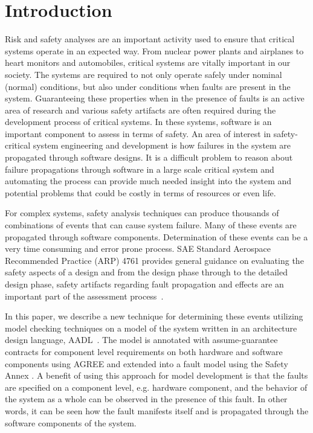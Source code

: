 \section{Introduction}
\label{sec:intro}

Risk and safety analyses are an important activity used to ensure that critical systems operate in an expected way. From nuclear power plants and airplanes to heart monitors and automobiles, critical systems are vitally important in our society. The systems are required to not only operate safely under nominal (normal) conditions, but also under conditions when faults are present in the system. Guaranteeing these properties when in the presence of faults is an active area of research and various safety artifacts are often required during the development process of critical systems. In these systems, software is an important component to assess in terms of safety. An area of interest in safety-critical system engineering and development is how failures in the system are propagated through software designs. It is a difficult problem to reason about failure propagations through software in a large scale critical system and automating the process can provide much needed insight into the system and potential problems that could be costly in terms of resources or even life. 

 For complex systems, safety analysis techniques can produce thousands of combinations of events that can cause system failure. Many of these events are propagated through software components. Determination of these events can be a very time consuming and error prone process. SAE Standard Aerospace Recommended Practice (ARP) 4761 provides general guidance on evaluating the safety aspects of a design and from the design phase through to the detailed design phase, safety artifacts regarding fault propagation and effects are an important part of the assessment process~\cite{SAE:ARP4761}. 

In this paper, we describe a new technique for determining these events utilizing model checking techniques on a model of the system written in an architecture design language, AADL~\cite{AADL_Standard}. The model is annotated with assume-guarantee contracts for component level requirements on both hardware and software components using AGREE and extended into a fault model using the Safety Annex \cite{Stewart17:IMBSA,SATechReport,QFCS15:backes}. A benefit of using this approach for model development is that the faults are specified on a component level, e.g. hardware component, and the behavior of the system as a whole can be observed in the presence of this fault. In other words, it can be seen how the fault manifests itself and is propagated through the software components of the system. 


